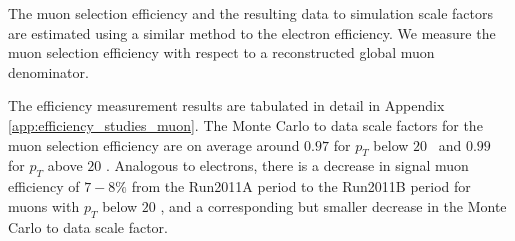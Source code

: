 
The muon selection efficiency and the resulting data to simulation
scale factors are estimated using a similar method to the electron efficiency. 
We measure the muon selection efficiency with respect to a reconstructed global muon
denominator. 

The efficiency measurement results are tabulated in detail in Appendix 
\ref{app:efficiency_studies_muon}. The Monte Carlo to data scale factors for the 
muon selection efficiency are on average around $0.97$ for $p_{T}$ below $20$ 
\GeV\ and $0.99$ for $p_{T}$ above $20$ \GeV.  
Analogous to electrons, there is a decrease in signal muon efficiency of $7-8\%$ from the
Run2011A period to the Run2011B period for muons with 
$p_{T}$ below $20$ \GeV, and a corresponding but smaller decrease in the 
Monte Carlo to data scale factor. 

